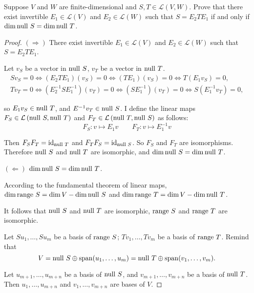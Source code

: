 \begin{exercise}
    Suppose $V$ and $W$ are finite-dimensional and $S, T \in \mathcal{L}(V, W)$. Prove that there exist invertible $E_{1} \in \mathcal{L}(V)$ and $E_{2} \in \mathcal{L}(W)$ such that $S = E_{2} TE_{1}$ if and only if $\dim \operatorname{null}\,{S} = \dim \operatorname{null}\,{T}$.
\end{exercise}

\begin{proof}
    $(\Rightarrow)$ There exist invertible $E_{1} \in \mathcal{L}(V)$ and $E_{2} \in \mathcal{L}(W)$ such that $S = E_{2} TE_{1}$.

    Let $v_{S}$ be a vector in $\operatorname{null}\,{S}$, $v_{T}$ be a vector in $\operatorname{null}\,{T}$.
    \[
        \begin{split}
            Sv_{S} = 0 \Leftrightarrow (E_{2}TE_{1})(v_{S}) = 0 \Leftrightarrow (TE_{1})(v_{S}) = 0 \Leftrightarrow T(E_{1}v_{S}) = 0, \\
            Tv_{T} = 0 \Leftrightarrow (E^{-1}_{2}SE^{-1}_{1})(v_{T}) = 0 \Leftrightarrow (SE^{-1}_{1})(v_{T}) = 0 \Leftrightarrow S(E^{-1}_{1}v_{T}) = 0,
        \end{split}
    \]

    so $E_{1}v_{S}\in \operatorname{null}\,{T}$, and $E^{-1}v_{T}\in \operatorname{null}\,{S}$. I define the linear maps $F_{S}\in\mathcal{L}\left({\operatorname{null}\,{S},\operatorname{null}\,{T}}\right)$ and $F_{T}\in\mathcal{L}\left({\operatorname{null}\,{T},\operatorname{null}\,{S}}\right)$ as follows:
    \[
        F_{S}: v\mapsto E_{1}v\qquad  F_{T}: v\mapsto E^{-1}_{1}v
    \]

    Then $F_{S}F_{T} = \operatorname{id}_{\operatorname{null}\,{T}}$ and $F_{T}F_{S} = \operatorname{id}_{\operatorname{null}\,{S}}$. So $F_{S}$ and $F_{T}$ are isomorphisms. Therefore $\operatorname{null}\,{S}$ and $\operatorname{null}\,{T}$ are isomorphic, and $\dim\operatorname{null}\,{S} = \dim\operatorname{null}\,{T}$.

    $(\Leftarrow)$ $\dim\operatorname{null}\,{S} = \dim\operatorname{null}\,{T}$.

    According to the fundamental theorem of linear maps, $\dim\operatorname{range}\,{S} = \dim V - \dim\operatorname{null}\,{S}$ and $\dim\operatorname{range}\,{T} = \dim V - \dim\operatorname{null}\,{T}$.

    It follows that $\operatorname{null}\,{S}$ and $\operatorname{null}\,{T}$ are isomorphic, $\operatorname{range}\,{S}$ and $\operatorname{range}\,{T}$ are isomorphic.

    Let $Su_{1}, \ldots, Su_{m}$ be a basis of $\operatorname{range}\,{S}$; $Tv_{1}, \ldots, Tv_{m}$ be a basis of $\operatorname{range}\,{T}$. Remind that
    \[
        V = \operatorname{null}\,{S}\oplus\operatorname{span}(u_{1}, \ldots, u_{m}) = \operatorname{null}\,{T}\oplus\operatorname{span}(v_{1}, \ldots, v_{m}).
    \]

    Let $u_{m+1}, \ldots, u_{m+n}$ be a basis of $\operatorname{null}\,{S}$, and $v_{m+1}, \ldots, v_{m+n}$ be a basis of $\operatorname{null}\,{T}$. Then $u_{1}, \ldots, u_{m+n}$ and $v_{1}, \ldots, v_{m+n}$ are bases of $V$.


\end{proof}
